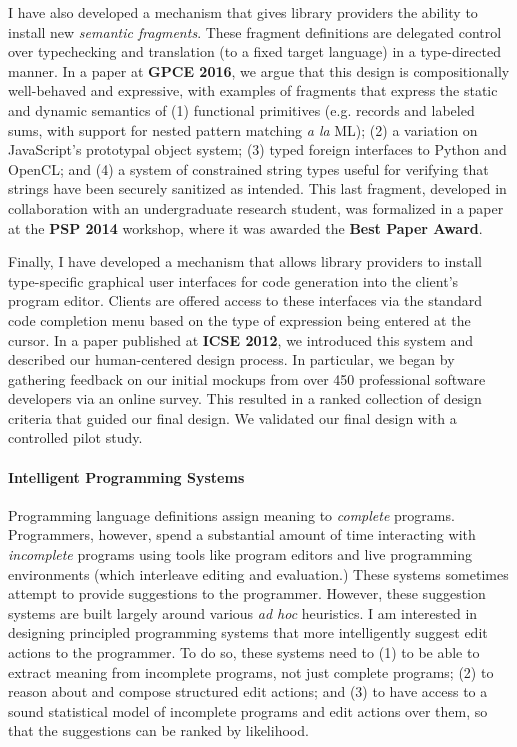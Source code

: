 \documentclass[9pt]{extarticle}
\let\li\lstinline
\begin{document}
I have also developed a mechanism that gives library providers the ability to install new \emph{semantic fragments}. These fragment definitions are delegated control over typechecking and translation (to a fixed target language) in a type-directed manner. In a paper at \textbf{GPCE 2016}, we argue that this design is compositionally well-behaved and expressive, with examples of
fragments that express the static and dynamic semantics of
(1) functional primitives (e.g. records and labeled sums, with support for nested pattern
matching \emph{a la} ML); (2) a variation on JavaScript's prototypal
object system; (3) typed foreign interfaces to Python and
OpenCL; and (4) a system of constrained string types useful for verifying that strings have been securely sanitized as intended. This last fragment, developed in collaboration with an undergraduate research student, was formalized in a paper at the \textbf{PSP 2014} workshop, where it was awarded the \textbf{Best Paper Award}. %

Finally, I have developed a mechanism that allows library providers to install type-specific {graphical user interfaces} for code generation into the client's program editor. Clients are offered access to these interfaces via the standard code completion menu based on the type of expression being entered at the cursor. In a paper published at \textbf{ICSE 2012}, we introduced this system and described our human-centered design process. In particular, we began by gathering feedback on our initial mockups from over 450 professional software developers via an online survey. This resulted in a ranked collection of design criteria that guided our final design. We validated our final design with a controlled pilot study.

\vspace{-8px}
\paragraph{Intelligent Programming Systems}
Programming language definitions assign meaning to \emph{complete} programs. 
Programmers, however, spend a substantial amount of time interacting with \emph{incomplete} programs using tools like program editors and live programming environments (which interleave editing and evaluation.) These systems sometimes attempt to provide suggestions to the programmer. However, these suggestion systems are built largely around various \emph{ad hoc} heuristics. I am interested in designing principled programming systems that more intelligently suggest edit actions to the programmer. To do so, these systems need to (1) to be able to extract meaning from incomplete programs, not just complete programs; (2) to reason about and compose structured edit actions; and (3) to have access to a sound statistical model of incomplete programs and edit actions over them, so that the suggestions can be ranked by likelihood.
\end{document}
